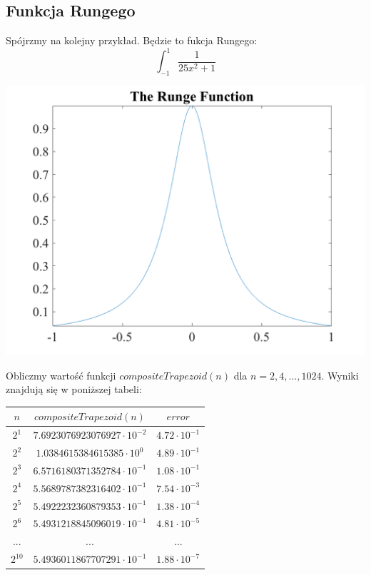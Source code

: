 \documentclass[12p]{article}
\begin{document}
\subsection{Funkcja Rungego}

Spójrzmy na kolejny przykład. Będzie to fukcja Rungego:
\[ \int_{-1}^{1} \frac{1}{25x^2 + 1}\]

\begin{center}
\includegraphics[scale=0.3]{img4.png}
\end{center}


Obliczmy wartość funkcji $compositeTrapezoid(n)$ dla $n = 2,4,...,1024$.
Wyniki znajdują się w poniższej tabeli:

\begin{table}[h]
\centering
\begin{tabular}{|c|c|c|}
    \hline
\large $n$   & $compositeTrapezoid(n)$   & $error$
    \normalsize\\
    \hline
    $2^1$      & $7.6923076923076927\cdot10^{-2}$ & $4.72\cdot10^{-1}$\\ \hline
    $2^2$      &   $1.0384615384615385\cdot10^{0}$ & $4.89\cdot10^{-1}$\\ \hline
    $2^3$      &  $6.5716180371352784\cdot10^{-1}$& $ 1.08\cdot10^{-1}$\\ \hline
    $2^4$      &  $5.5689787382316402\cdot 10^{-1}$ & $7.54\cdot 10^{-3}$\\ \hline
    $2^5$      &  $5.4922232360879353\cdot 10^{-1}$&$1.38\cdot 10^{-4}$ \\ \hline
    $2^6$      &  $5.4931218845096019\cdot 10^{-1}$&$4.81\cdot 10^{-5}$ \\ \hline

    $...$      &  $...$&$...$ \\ \hline
    $2^{10}$      &  $5.4936011867707291\cdot 10^{-1}$&$1.88\cdot 10^{-7}$ \\ \hline

\end{tabular}
\end{table}
\end{document}
